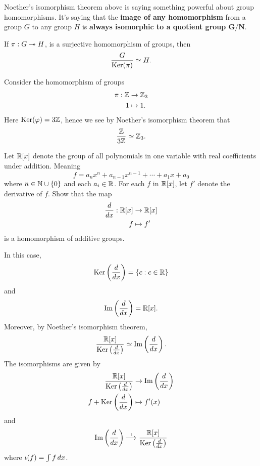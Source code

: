 \documentclass{ximera}
\begin{document}
Noether's isomorphism theorem above is saying something powerful about
group homomorphisms. It's saying that the \textbf{image of any
  homomorphism} from a group $G$ to any group $H$ is \textbf{always
  isomorphic to a quotient group $\boldsymbol{G/N}$}.


\begin{corollary}
  If $\pi:G\twoheadrightarrow H$, is a surjective homomorphism of groups, then
  \[
  \frac{G}{\mathop{\mathrm{Ker}}\nolimits(\pi)} \simeq H.
  \]
\end{corollary}

\begin{example}
  Consider the homomorphism of groups
  \begin{align*}
    \pi:\mathbb Z &\to \mathbb Z_3\\
    1 &\mapsto 1.
  \end{align*}
  Here $\mathop{\mathrm{Ker}}\nolimits(\varphi)= 3\mathbb Z$, hence we see by Noether's isomorphism
  theorem that
  \[
  \frac{\mathbb Z}{3\mathbb Z}\simeq \mathbb Z_3.
  \]
\end{example}



\begin{example}
  Let $\mathbb R[x]$ denote the group of all polynomials in one variable with
  real coefficients under addition. Meaning
  \[
  f = a_nx^{n} + a_{n-1}x^{n-1} + \cdots + a_1x + a_0
  \]
  where $n\in\mathbb N\cup\{0\}$ and each $a_i\in\mathbb R$.  For each $f$ in $\mathbb R[x]$,
  let $f'$ denote the derivative of $f$. Show that the map
  \begin{align*}
    \frac{d}{dx}:\mathbb R[x]&\to\mathbb R[x]\\
    f  &\mapsto f'
  \end{align*}
  is a homomorphism of additive groups.



  In this case,
  \[
  \mathop{\mathrm{Ker}}\nolimits\left(\frac{d}{dx}\right) = \{c:c\in \mathbb R\}
  \]
  and
  \[
  \operatorname{Im}\left(\frac{d}{dx}\right) =\mathbb R[x].
  \]
  Moreover, by Noether's isomorphism theorem,
  \[
  \frac{\mathbb R[x]}{\mathop{\mathrm{Ker}}\nolimits\left(\frac{d}{dx}\right)} \simeq \operatorname{Im}\left(\frac{d}{dx}\right).
  \]
  The isomorphisms are given by
  \begin{align*}
    \frac{\mathbb R[x]}{\mathop{\mathrm{Ker}}\nolimits\left(\frac{d}{dx}\right)} &\to \operatorname{Im}\left(\frac{d}{dx}\right)\\
    f+\mathop{\mathrm{Ker}}\nolimits\left(\frac{d}{dx}\right) &\mapsto f'(x)
  \end{align*}
  and
  \[
  \operatorname{Im}\left(\frac{d}{dx}\right) \mathop{\longrightarrow\,}\limits^{\iota}\frac{\mathbb R[x]}{\mathop{\mathrm{Ker}}\nolimits\left(\frac{d}{dx}\right)}
  \]
  where $\iota(f) = \int f \, d x$.
\end{example}
\end{document}
